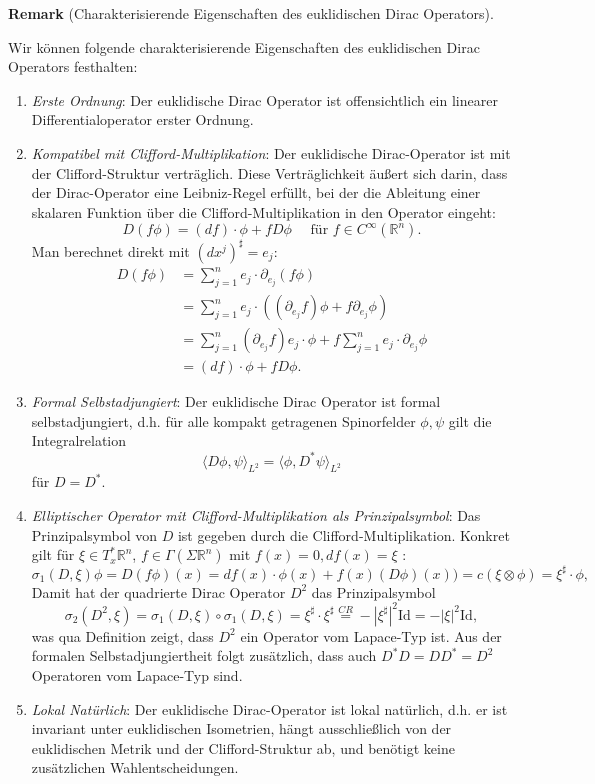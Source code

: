 \documentclass[10pt, letterpaper]{article}
\newcommand{\R}{\mathbb{R}}
\newcommand{\CustomHeading}[3]{%
  \par\medskip\noindent%
  \textbf{#1 #2} \textnormal{(#3)}.\enskip%
}
\newenvironment{REM}[2]{\CustomHeading{Remark}{#1}{#2}}{}
\begin{document}
\begin{REM}{}{Charakterisierende Eigenschaften des euklidischen Dirac Operators}
  Wir können folgende charakterisierende Eigenschaften des euklidischen Dirac Operators festhalten:
  \begin{enumerate}
    \item \emph{Erste Ordnung}: Der euklidische Dirac Operator ist offensichtlich ein linearer Differentialoperator erster Ordnung.
    
    \item \emph{Kompatibel mit Clifford-Multiplikation}: 
    Der euklidische Dirac-Operator ist mit der Clifford-Struktur verträglich. Diese Verträglichkeit äußert sich darin, dass der Dirac-Operator eine Leibniz-Regel erfüllt, bei der die Ableitung einer skalaren Funktion über die Clifford-Multiplikation in den Operator eingeht:
    $$
    D(f \phi)=(df) \cdot \phi+f D \phi \quad \text { für } f \in C^{\infty}\left(\mathbb{R}^n\right) .
    $$
    Man berechnet direkt mit $(dx^j)^\sharp=e_j$:
    $$\begin{aligned} D(f \phi) & =\sum_{j=1}^n e_j \cdot \partial_{e_j}(f \phi) \\ & =\sum_{j=1}^n e_j \cdot\left(\left(\partial_{e_j} f\right) \phi+f \partial_{e_j} \phi\right) \\ & =\sum_{j=1}^n\left(\partial_{e_j} f\right) e_j \cdot \phi+f \sum_{j=1}^n e_j \cdot \partial_{e_j} \phi \\ & = (d f)\cdot \phi+f D \phi.\end{aligned}$$

    \item \emph{Formal Selbstadjungiert}: Der euklidische Dirac Operator ist formal selbstadjungiert, d.h. für alle kompakt getragenen Spinorfelder $\phi, \psi$ gilt die Integralrelation
    $$
    \langle D \phi, \psi\rangle_{L^2}=\langle\phi, D^*\psi\rangle_{L^2}
    $$
    für $D=D^*$. 

    \item \emph{Elliptischer Operator mit Clifford-Multiplikation als Prinzipalsymbol}: Das Prinzipalsymbol von $D$ ist gegeben durch die Clifford-Multiplikation.
    Konkret gilt für $\xi \in T_x^* \mathbb{R}^n$, $f\in \Gamma(\Sigma \R^n)$ mit $f(x)=0,df(x)=\xi$ :
    $$
    \sigma_1(D, \xi)\phi= D (f\phi)(x)= df(x) \cdot \phi(x)+ f(x)(D\phi)(x))= c(\xi\otimes\phi)=\xi^\sharp\cdot \phi,
    $$
    Damit hat der quadrierte Dirac Operator $D^2$ das Prinzipalsymbol
    $$
    \sigma_2(D^2, \xi)=\sigma_1(D, \xi)\circ \sigma_1(D, \xi) = \xi^\sharp\cdot\xi^\sharp\overset{CR}{=} -|\xi^\sharp|^2 \mathrm{Id}=-|\xi|^2\mathrm{Id},
    $$
    was qua Definition zeigt, dass $D^2$ ein Operator vom Lapace-Typ ist. Aus der formalen Selbstadjungiertheit folgt zusätzlich, dass auch $D^*D=DD^*=D^2$ Operatoren vom Lapace-Typ sind.

    \item \emph{Lokal Natürlich}: Der euklidische Dirac-Operator ist lokal natürlich, d.h. er ist invariant unter euklidischen Isometrien, hängt ausschließlich von der euklidischen Metrik und der Clifford-Struktur ab, und benötigt keine zusätzlichen Wahlentscheidungen.
  \end{enumerate}
\end{REM}


\bigskip

\printbibliography[heading=bibintoc]
\end{document}
